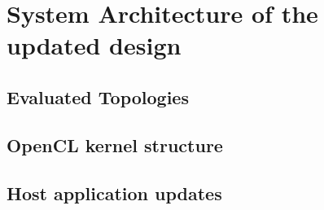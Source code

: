 \chapter{System Architecture of the updated design}
\label{cha:sys_arch}

\section{Evaluated Topologies}


\section{OpenCL kernel structure}

\section{Host application updates}